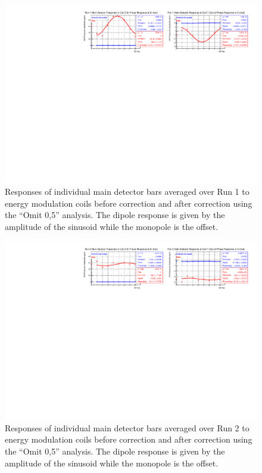 \begin{landscape}
\begin{figure}[!ht]
\begin{center}
\includegraphics[width=9in]{./Pictures/Run1_E_dipoleOmit05.pdf}
\caption{\label{fig:Run1_Omit05_Ydipoles_app}Responses of individual main detector bars averaged over Run 1 to energy modulation coils before correction and after correction using the ``Omit 0,5'' analysis. The dipole response is given by the amplitude of the sinusoid while the monopole is the offset.}
\end{center}
\end{figure}

\begin{figure}[!ht]
\begin{center}
\includegraphics[width=9in]{./Pictures/Run2_E_dipoleOmit05.pdf}
\caption{\label{fig:Run2_Omit05_Edipoles_app}Responses of individual main detector bars averaged over Run 2 to energy modulation coils before correction and after correction using the ``Omit 0,5'' analysis. The dipole response is given by the amplitude of the sinusoid while the monopole is the offset.}
\end{center}
\end{figure}


\end{landscape}
